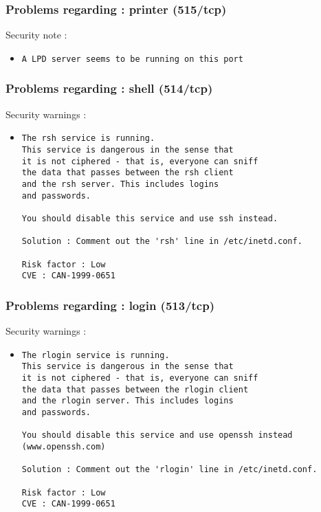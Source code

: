 \documentclass{article}
\begin{document}
\subsubsection{Problems regarding : printer (515/tcp)}
Security note :\\
\begin{itemize}
\item \begin{verbatim}
A LPD server seems to be running on this port
\end{verbatim}\end{itemize}
\subsubsection{Problems regarding : shell (514/tcp)}
Security warnings :\\
\begin{itemize}
\item \begin{verbatim}
The rsh service is running.
This service is dangerous in the sense that
it is not ciphered - that is, everyone can sniff
the data that passes between the rsh client
and the rsh server. This includes logins
and passwords.

You should disable this service and use ssh instead.

Solution : Comment out the 'rsh' line in /etc/inetd.conf.

Risk factor : Low
CVE : CAN-1999-0651
\end{verbatim}\end{itemize}
\subsubsection{Problems regarding : login (513/tcp)}
Security warnings :\\
\begin{itemize}
\item \begin{verbatim}
The rlogin service is running.
This service is dangerous in the sense that
it is not ciphered - that is, everyone can sniff
the data that passes between the rlogin client
and the rlogin server. This includes logins
and passwords.

You should disable this service and use openssh instead
(www.openssh.com)

Solution : Comment out the 'rlogin' line in /etc/inetd.conf.

Risk factor : Low
CVE : CAN-1999-0651
\end{verbatim}\end{itemize}
\end{document}
